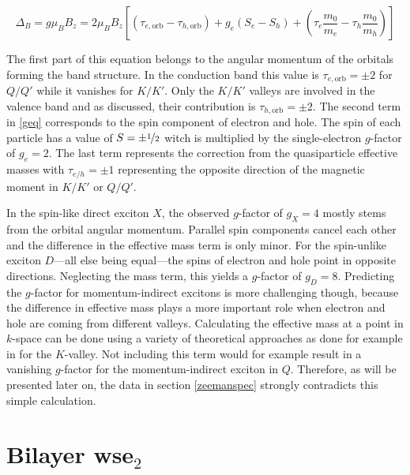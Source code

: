 \[\Delta_B=g\mu_BB_z = 2\mu_BB_z\left[(\tau_{e, \mathrm{orb}}-\tau_{h, \mathrm{orb}})+g_e(S_e-S_h) + \left(\tau_e \frac{m_0}{m_e}-\tau_h \frac{m_0}{m_h}\right)\right]\label{geq}\]

The first part of this equation belongs to the angular momentum of the orbitals forming the band structure. In the conduction band this value is $\tau_{e, \mathrm{orb}}=\pm2$ for $Q/Q'$ while it vanishes for $K/K'$. Only the $K/K'$ valleys are involved in the valence band and as discussed, their contribution is $\tau_{h, \mathrm{orb}}=\pm2$. The second term in \eqref{geq} corresponds to the spin component of electron and hole. The spin of each particle has a value of $S=\pm\nicefrac{1}{2}$ witch is multiplied by the single-electron $g$-factor of $g_e=2$. The last term represents the correction from the quasiparticle effective masses with $\tau_{e/h}=\pm1$ representing the opposite direction of the magnetic moment in $K/K'$ or $Q/Q'$.

In the spin-like direct exciton $X$, the observed $g$-factor of $g_X=4$ mostly stems from the orbital angular momentum. Parallel spin components cancel each other and the difference in the effective mass term is only minor. For the spin-unlike exciton $D$---all else being equal---the spins of electron and hole point in opposite directions. Neglecting the mass term, this yields a $g$-factor of $g_D=8$. Predicting the $g$-factor for momentum-indirect excitons is more challenging though, because the difference in effective mass plays a more important role when electron and hole are coming from different valleys. Calculating the effective mass at a point in $k$-space can be done using a variety of theoretical approaches as done for example in  \cite{rybkovskiy_atomically_2017} for the $K$-valley. Not including this term would for example result in a vanishing $g$-factor for the momentum-indirect exciton in $Q$. Therefore, as will be presented later on, the data in section \ref{zeemanspec} strongly contradicts this simple calculation.

\section{Bilayer ws\textup{e}$_2$}\label{bilayer_theory}

